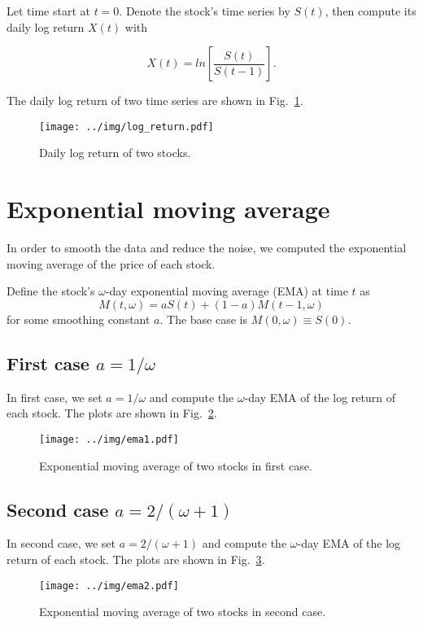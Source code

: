 \documentclass[runningheads]{llncs}
\begin{document}
Let time start at $t = 0$. Denote the stock's time series by $S(t)$, then compute its daily log return $X(t)$ with

\begin{equation}
    X(t) = ln \left[\frac{S(t)}{S(t-1)}\right].
\end{equation}

The daily log return of two time series are shown in Fig.~\ref{fig:log_return}.

\begin{figure}
    \centering
    \texttt{[image: ../img/log\_return.pdf]}
    \caption{Daily log return of two stocks.}
    \label{fig:log_return}
\end{figure}

\section{Exponential moving average}
In order to smooth the data and reduce the noise, we computed the exponential moving average of the price of each stock.

Define the stock's $\omega$-day exponential moving average (EMA) at time $t$ as
$$
    M(t, \omega) = aS(t) + (1 - a)M(t - 1, \omega)
$$
for some smoothing constant $a$. The base case is $M(0, \omega) ≡ S(0)$.

\subsection{First case $a=1/\omega$}

In first case, we set $a = 1/\omega$ and compute the $\omega$-day EMA of the log return of each stock.
The plots are shown in Fig.~\ref{fig:ema1}.

\begin{figure}
    \centering
    \texttt{[image: ../img/ema1.pdf]}
    \caption{Exponential moving average of two stocks in first case.}
    \label{fig:ema1}
\end{figure}

\subsection{Second case $a=2/(\omega + 1)$}

In second case, we set $a = 2/(\omega + 1)$ and compute the $\omega$-day EMA of the log return of each stock.
The plots are shown in Fig.~\ref{fig:ema2}.

\begin{figure}
    \centering
    \texttt{[image: ../img/ema2.pdf]}
    \caption{Exponential moving average of two stocks in second case.}
    \label{fig:ema2}
\end{figure}
\end{document}
